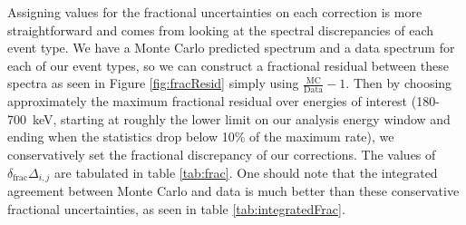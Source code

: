 Assigning values for the fractional uncertainties on each correction is more straightforward
and comes from looking at the spectral discrepancies of each event type. We have a Monte
Carlo predicted spectrum and a data spectrum for each of our event types, so we can construct
a fractional residual between these spectra as seen in Figure \ref{fig:fracResid} simply using
$\frac{\mathrm{MC}}{\mathrm{Data}}-1$. Then by choosing approximately
the maximum fractional residual over energies of interest (180-700~keV, starting at roughly the lower
limit on our analysis energy window and ending when the statistics drop below 10\% of the maximum rate),
we conservatively set the fractional discrepancy of our corrections. The values of 
$\delta_{\mathrm{frac}}\Delta_{i,j}$ are tabulated in table \ref{tab:frac}.
One should note
that the integrated agreement between Monte Carlo and data is much better than these
conservative fractional uncertainties, as seen in table \ref{tab:integratedFrac}.

